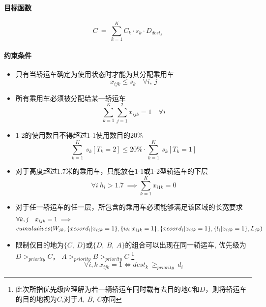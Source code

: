 \documentclass[UTF8，12pt]{ctexart}
\begin{document}
\paragraph{目标函数}
			\begin{equation}
				C \ = \ \sum_{k=1}^{K}C_k \cdot s_k \cdot D_{dest_k}
			\end{equation}
	
\paragraph{约束条件}
	\begin{itemize}
		\item 只有当轿运车确定为使用状态时才能为其分配乘用车
		\begin{equation}
		 x_{ijk} \leq s_k  \quad 	\forall i,~ j
		\end{equation}
		
		\item 所有乘用车必须被分配给某一轿运车
		\begin{equation}
			\sum_{k=1}^{K} \sum_{j=1}^{2} x_{ijk}=1 \quad \forall i
		\end{equation}
		
		\item 1-2的使用数目不得超过1-1使用数目的20\%
		\begin{equation}
			\sum_{k=1}^{K} \ s_k[T_k=2] \leq 20\% \cdot \sum_{k=1}^{K}  \ s_k[T_k=1]
		\end{equation}
		
		\item 对于高度超过1.7米的乘用车，只能放在1-1或1-2型轿运车的下层
		\begin{equation}
			\forall i \ h_i>1.7 \ \implies \sum_{k=1}^{K}x_{i1k}=0
		\end{equation}
		
		\item 对于任一轿运车的任一层，所包含的乘用车必须能够满足该区域的长宽要求
		\begin{align}
		&	\forall k, j \quad  x_{ijk}=1  \implies \notag\\
		&		 cumulatives(W_{jk}, \{xcoord_i | x_{ijk}=1 \},\{ w_i | x_{ijk}=1\},  \{xcoord_i | x_{ijk}=1 \}, \{l_i | x_{ijk}=1\}, L_{jk}) 
		\end{align}
		
		
		\item  限制仅目的地为$\{C,~D\}$或$\{D,~B,~A\}$的组合可以出现在同一轿运车,
			优先级为$D >_{priority} C$， $A >_{priority} B >_{priority} C $
			\footnote{此次所指优先级应理解为若一辆轿运车同时载有去目的地$C$和$D$，则将轿运车的目的地视为$C$,对于$A,~B,~C$亦同}
		\begin{equation}
			\forall i,k \  x_{ijk}=1 \Leftrightarrow 	dest_k \ \geq_{priority} \ d_i
		\end{equation}
		
	\end{itemize}
\end{document}
